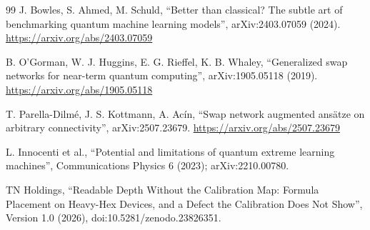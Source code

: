 \documentclass[11pt]{article}
\begin{document}
\begin{thebibliography}{99}
 J. Bowles, S. Ahmed, M. Schuld, ``Better than classical? The subtle art of benchmarking quantum
machine learning models'', arXiv:2403.07059 (2024). \url{https://arxiv.org/abs/2403.07059}

 B. O'Gorman, W. J. Huggins, E. G. Rieffel, K. B. Whaley, ``Generalized swap networks for
near-term quantum computing'', arXiv:1905.05118 (2019). \url{https://arxiv.org/abs/1905.05118}

 T. Parella-Dilm\'e, J. S. Kottmann, A. Ac\'in, ``Swap network augmented ans\"atze on arbitrary
connectivity'', arXiv:2507.23679. \url{https://arxiv.org/abs/2507.23679}

 L. Innocenti et al., ``Potential and limitations of quantum extreme learning machines'',
Communications Physics 6 (2023); arXiv:2210.00780.

 TN Holdings, ``Readable Depth Without the Calibration Map: Formula Placement on Heavy-Hex Devices,
and a Defect the Calibration Does Not Show'', Version 1.0 (2026), doi:10.5281/zenodo.23826351.

\end{thebibliography}
\end{document}
